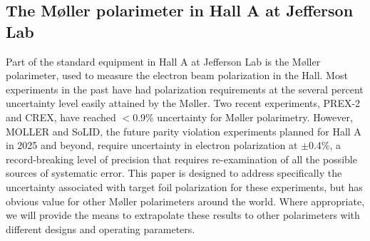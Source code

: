 \documentclass[preprint,12pt]{elsarticle}
\begin{document}
\subsection{The M\o ller polarimeter in Hall A at Jefferson Lab}
Part of the standard equipment in Hall A at Jefferson Lab is the M\o ller polarimeter, used to measure the electron beam polarization in the Hall. Most experiments in the past have had polarization requirements at the several percent uncertainty level easily attained by the M\o ller. Two recent experiments, PREX-2\cite{PREX2021} and CREX, have reached $<$0.9\% uncertainty for M\o ller polarimetry. However,  MOLLER and SoLID, the future parity violation experiments planned for Hall A in 2025 and beyond, require uncertainty in electron polarization at $\pm$0.4\%, a record-breaking level of precision that requires re-examination of all the possible sources of systematic error. This paper is designed to address specifically the uncertainty associated with target foil polarization for these experiments, but has obvious value for other M\o ller polarimeters around the world. Where appropriate, we will provide the means to extrapolate these results to other polarimeters with different designs and operating parameters.
\end{document}
